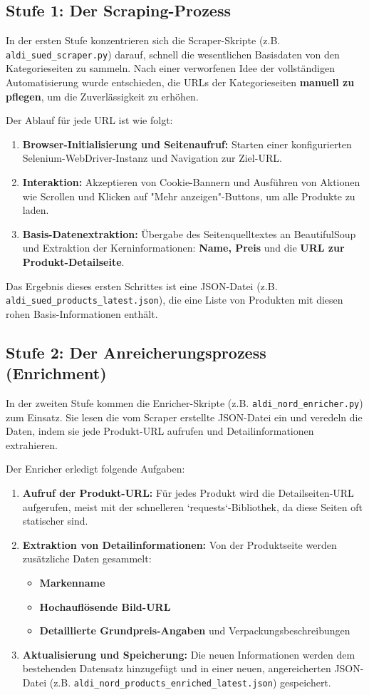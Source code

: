 \documentclass[12pt, a4paper]{report} %
\begin{document}
\subsection{Stufe 1: Der Scraping-Prozess}
In der ersten Stufe konzentrieren sich die Scraper-Skripte (z.B. \texttt{aldi\_sued\_scraper.py}) darauf, schnell die wesentlichen Basisdaten von den Kategorieseiten zu sammeln. Nach einer verworfenen Idee der vollständigen Automatisierung wurde entschieden, die URLs der Kategorieseiten \textbf{manuell zu pflegen}, um die Zuverlässigkeit zu erhöhen.

Der Ablauf für jede URL ist wie folgt:
\begin{enumerate}
    \item \textbf{Browser-Initialisierung und Seitenaufruf:} Starten einer konfigurierten Selenium-WebDriver-Instanz und Navigation zur Ziel-URL.
    \item \textbf{Interaktion:} Akzeptieren von Cookie-Bannern und Ausführen von Aktionen wie Scrollen und Klicken auf "Mehr anzeigen"-Buttons, um alle Produkte zu laden.
    \item \textbf{Basis-Datenextraktion:} Übergabe des Seitenquelltextes an BeautifulSoup und Extraktion der Kerninformationen: \textbf{Name, Preis} und die \textbf{URL zur Produkt-Detailseite}.
\end{enumerate}
Das Ergebnis dieses ersten Schrittes ist eine JSON-Datei (z.B. \texttt{aldi\_sued\_products\_latest.json}), die eine Liste von Produkten mit diesen rohen Basis-Informationen enthält.

\subsection{Stufe 2: Der Anreicherungsprozess (Enrichment)}
In der zweiten Stufe kommen die Enricher-Skripte (z.B. \texttt{aldi\_nord\_enricher.py}) zum Einsatz. Sie lesen die vom Scraper erstellte JSON-Datei ein und veredeln die Daten, indem sie jede Produkt-URL aufrufen und Detailinformationen extrahieren.

Der Enricher erledigt folgende Aufgaben:
\begin{enumerate}
    \item \textbf{Aufruf der Produkt-URL:} Für jedes Produkt wird die Detailseiten-URL aufgerufen, meist mit der schnelleren `requests`-Bibliothek, da diese Seiten oft statischer sind.
    \item \textbf{Extraktion von Detailinformationen:} Von der Produktseite werden zusätzliche Daten gesammelt:
        \begin{itemize}
            \item \textbf{Markenname}
            \item \textbf{Hochauflösende Bild-URL}
            \item \textbf{Detaillierte Grundpreis-Angaben} und Verpackungsbeschreibungen
        \end{itemize}
    \item \textbf{Aktualisierung und Speicherung:} Die neuen Informationen werden dem bestehenden Datensatz hinzugefügt und in einer neuen, angereicherten JSON-Datei (z.B. \texttt{aldi\_nord\_products\_enriched\_latest.json}) gespeichert.
\end{enumerate}
\end{document}
